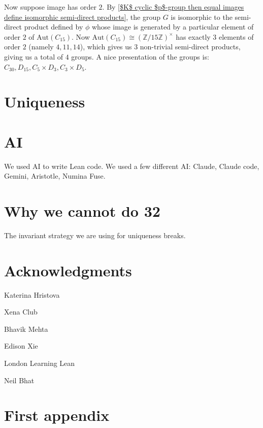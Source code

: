 Now suppose image has order $2$. By \ref{$K$ cyclic $p$-group then equal images define isomorphic semi-direct products}, the group $G$ is isomorphic to the semi-direct product defined by $\phi$ whose image is generated by a particular element of order $2$ of $\text{Aut}(C_{15})$. Now $\text{Aut}(C_{15}) \cong (\mathbb{Z}/15\mathbb{Z})^\times$ has exactly $3$ elements of order $2$ (namely $4, 11, 14$), which gives us $3$ non-trivial semi-direct products, giving us a total of $4$ groups. A nice presentation of the groups is: $C_{30}, D_{15}, C_5 \times D_3, C_3 \times D_5$.

\section{Uniqueness}

\section{AI}
We used AI to write Lean code.
We used a few different AI: Claude, Claude code, Gemini, Aristotle, Numina Fuse.

\section{Why we cannot do 32}
The invariant strategy we are using for uniqueness breaks.


\section*{Acknowledgments}
Katerina Hristova

Xena Club

Bhavik Mehta

Edison Xie

London Learning Lean

Neil Bhat

\appendix

\section{First appendix}
\label{sec:appendix1}

